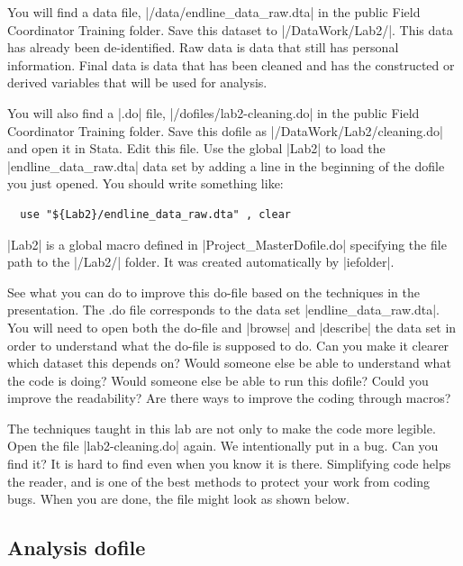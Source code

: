 \documentclass{tufte-handout}
\begin{document}
You will find a data file, |/data/endline_data_raw.dta|
in the public Field Coordinator Training folder.
Save this dataset to |/DataWork/Lab2/|.
This data has already been de-identified.
Raw data is data that still has personal information.
Final data is data that has been cleaned
and has the constructed or derived variables that will be used for analysis.

You will also find a |.do| file, |/dofiles/lab2-cleaning.do|
in the public Field Coordinator Training folder.
Save this dofile as |/DataWork/Lab2/cleaning.do| and open it in Stata.
Edit this file.
Use the global |Lab2| to load the |endline_data_raw.dta| data set
by adding a line in the beginning of the dofile you just opened.
You should write something like:
\begin{Verbatim}
  use "${Lab2}/endline_data_raw.dta" , clear
\end{Verbatim}
|Lab2| is a global macro defined in |Project_MasterDofile.do|
specifying the file path to the |/Lab2/| folder.
It was created automatically by |iefolder|.

See what you can do to improve this do-file
based on the techniques in the presentation.
The .do file corresponds to the data set |endline_data_raw.dta|.
You will need to open both the do-file and |browse| and |describe|
the data set in order to understand what the do-file is supposed to do.
Can you make it clearer which dataset this depends on?
Would someone else be able to understand what the code is doing?
Would someone else be able to run this dofile?
Could you improve the readability?
Are there ways to improve the coding through macros?

The techniques taught in this lab are not only to make the code more legible.
Open the file |lab2-cleaning.do| again.
We intentionally put in a bug. Can you find it?
It is hard to find even when you know it is there.
Simplifying code helps the reader,
and is one of the best methods to protect your work from coding bugs.
When you are done, the file might look as shown below.

\begin{figure}[h]
{
}
\end{figure}

\subsection{Analysis dofile}
\end{document}
